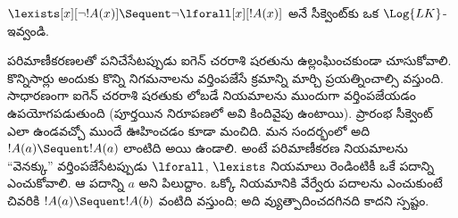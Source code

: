 \documentclass[../../../include/open-logic-section]{subfiles}
\begin{document}


\begin{ex}
$\lexists[x][\lnot !A(x)] \Sequent \lnot \lforall[x][!A(x)]$ అనే
సీక్వెంట్‌కు ఒక $\Log{LK}$- ఇవ్వండి.

పరిమాణీకరణలతో పనిచేసేటప్పుడు ఐగెన్ చరరాశి షరతును ఉల్లంఘించకుండా
చూసుకోవాలి. కొన్నిసార్లు అందుకు కొన్ని నిగమనాలను వర్తింపజేసే క్రమాన్ని
మార్చి ప్రయత్నించాల్సి వస్తుంది. సాధారణంగా ఐగెన్ చరరాశి షరతుకు లోబడే
నియమాలను ముందుగా వర్తింపజేయడం ఉపయోగపడుతుంది (పూర్తయిన నిరూపణలో అవి
కిందివైపు ఉంటాయి). ప్రారంభ సీక్వెంట్ ఎలా ఉండవచ్చో ముందే
ఊహించడం కూడా మంచిది. మన సందర్భంలో అది
$!A(a) \Sequent !A(a)$ లాంటిది అయి ఉండాలి. అంటే పరిమాణీకరణ నియమాలను
“వెనక్కు” వర్తింపజేసేటప్పుడు $\lforall$, $\lexists$ నియమాలు రెండింటికీ
ఒకే పదాన్ని ఎంచుకోవాలి. ఆ పదాన్ని $a$ అని పిలుద్దాం. ఒక్కో నియమానికి వేర్వేరు
పదాలను ఎంచుకుంటే చివరికి $!A(a) \Sequent !A(b)$ వంటిది వస్తుంది;
అది వ్యుత్పాదించదగినది కాదని స్పష్టం.


\end{ex}
\end{document}
